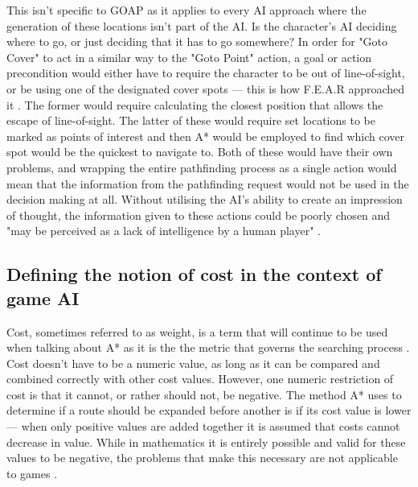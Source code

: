 \documentclass[11pt, a4paper]{report}
\begin{document}
This isn't specific to GOAP as it applies to every AI approach where the generation of these locations isn't part of the AI. Is the character's AI deciding where to go, or just deciding that it has to go somewhere? In order for "Goto Cover" to act in a similar way to the "Goto Point" action, a goal or action precondition would either have to require the character to be out of line-of-sight, or be using one of the designated cover spots --- this is how F.E.A.R \parencite*{FEAR} approached it \parencite[12]{orkin2006three}. The former would require calculating the closest position that allows the escape of line-of-sight. The latter of these would require set locations to be marked as points of interest and then A* would be employed to find which cover spot would be the quickest to navigate to. Both of these would have their own problems, and wrapping the entire pathfinding process as a single action would mean that the information from the pathfinding request would not be used in the decision making at all. Without utilising the AI's ability to create an impression of thought, the information given to these actions could be poorly chosen and "may be perceived as a lack of intelligence by a human player" \parencite[63]{graham2003pathfinding}.

\subsection{Defining the notion of cost in the context of game AI}
\label{subsec:definingTheNotionOfCost}

Cost, sometimes referred to as weight, is a term that will continue to be used when talking about A* as it is the the metric that governs the searching process \parencite[60]{graham2003pathfinding}. Cost doesn't have to be a numeric value, as long as it can be compared and combined correctly with other cost values. However, one numeric restriction of cost is that it cannot, or rather should not, be negative. The method A* uses to determine if a route should be expanded before another is if its cost value is lower --- when only positive values are added together it is assumed that costs cannot decrease in value. While in mathematics it is entirely possible and valid for these values to be negative, the problems that make this necessary are not applicable to games \parencite[202]{millington2019ai}.
\end{document}
